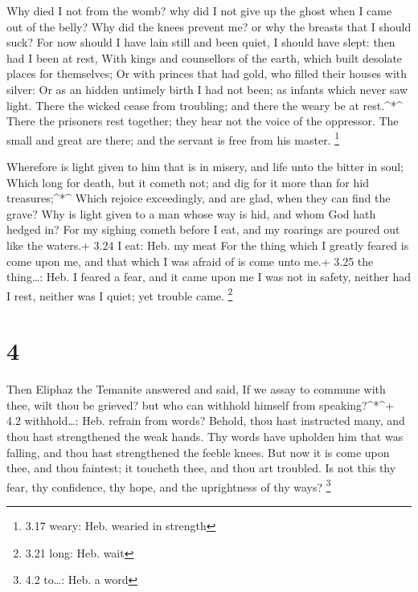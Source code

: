  Why died I not from the womb? why did I not give up the
ghost when I came out of the belly?  Why did the knees
prevent me? or why the breasts that I should suck?  For now
should I have lain still and been quiet, I should have slept: then had I
been at rest,  With kings and counsellors of the earth,
which built desolate places for themselves;  Or with
princes that had gold, who filled their houses with silver:
 Or as an hidden untimely birth I had not been; as infants
which never saw light.  There the wicked cease from
troubling; and there the weary be at rest.\^{}*\^{}  There
the prisoners rest together; they hear not the voice of the oppressor.
 The small and great are there; and the servant is free
from his master. \footnote{3.17 weary: Heb. wearied in strength}

 Wherefore is light given to him that is in misery, and
life unto the bitter in soul;  Which long for death, but it
cometh not; and dig for it more than for hid treasures;\^{}*\^{}
 Which rejoice exceedingly, and are glad, when they can
find the grave?  Why is light given to a man whose way is
hid, and whom God hath hedged in?  For my sighing cometh
before I eat, and my roarings are poured out like the waters.+ 3.24 I
eat: Heb. my meat  For the thing which I greatly feared is
come upon me, and that which I was afraid of is come unto me.+ 3.25 the
thing\ldots: Heb. I feared a fear, and it came upon me  I
was not in safety, neither had I rest, neither was I quiet; yet trouble
came. \footnote{3.21 long: Heb. wait}

\hypertarget{section-3}{%
\section{4}\label{section-3}}

 Then Eliphaz the Temanite answered and said, 
If we assay to commune with thee, wilt thou be grieved? but who can
withhold himself from speaking?\^{}*\^{}+ 4.2 withhold\ldots: Heb.
refrain from words?  Behold, thou hast instructed many, and
thou hast strengthened the weak hands.  Thy words have
upholden him that was falling, and thou hast strengthened the feeble
knees.  But now it is come upon thee, and thou faintest; it
toucheth thee, and thou art troubled.  Is not this thy fear,
thy confidence, thy hope, and the uprightness of thy ways? \footnote{4.2
  to\ldots: Heb. a word}

